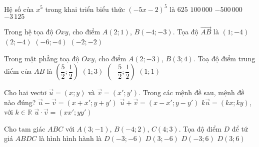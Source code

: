 \begin{ex}%
	Hệ số của $x^5$ trong khai triển biểu thức $\left(- 5x - 2\right)^5$ là
	\choice
	{$625$}
	{$100\,000$}
	{$-500\,000$}
	{\True $-3\,125$}
\end{ex}

\begin{ex}%
	Trong hệ tọa độ $Oxy$, cho điểm $A(2;1)$, $B(-4;-3)$. Tọa độ $\vec{AB}$ là
	\choice
	{$(1;-4)$}
	{$(2;-4)$}
	{\True $(-6;-4)$}
	{$(-2;-2)$}
	\loigiai{

	}
\end{ex}

\begin{ex}%
	Trong mặt phẳng toạ độ $Oxy$, cho điểm $A(2;-3)$, $B(3;4)$. Toạ độ điểm trung điểm của $AB$ là
	\choice
	{\True $\left(\dfrac{5}{2};\dfrac{1}{2}\right)$}
	{$(1;3)$}
	{$\left(-\dfrac{5}{2};\dfrac{1}{2}\right)$}
	{$(1;1)$}
\end{ex}
\begin{ex}
	Cho hai vectơ $\vec{u}=(x;y)$ và $\vec{v}=(x';y')$. Trong các mệnh đề sau, mệnh đề nào đúng?
	\choice
	{$\vec{u}-\vec{v}=(x+x';y+y')$}
	{$\vec{u}+\vec{v}=(x-x';y-y')$}
	{\True $k\vec{u}=(kx;ky)$, với $k\in\mathbb{R}$}
	{$\vec{u}\cdot \vec{v}=(xx';yy')$}
\end{ex}
\begin{ex}%
	Cho tam giác $ABC$ với $A(3;-1)$, $B(-4;2)$, $C(4;3)$. Tọa độ điểm $D$ để tứ giá $ABDC$ là hình hình hành là
	\choice
	{$D(-3;-6)$}
	{$D(3;-6)$}
	{\True $D(-3;6)$}
	{$D(3;6)$}
\end{ex}

